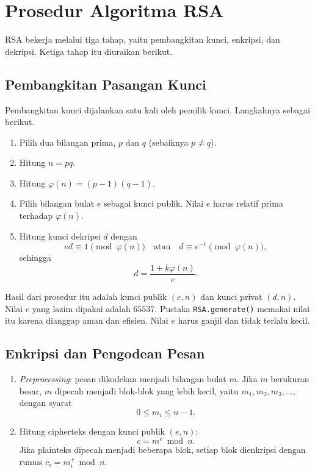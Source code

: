 \section{Prosedur Algoritma RSA}
\label{sec:prosedur-rsa}

RSA bekerja melalui tiga tahap, yaitu pembangkitan kunci, enkripsi, dan
dekripsi. Ketiga tahap itu diuraikan berikut.

\subsection{Pembangkitan Pasangan Kunci}

Pembangkitan kunci dijalankan satu kali oleh pemilik kunci. Langkahnya sebagai
berikut.
\begin{enumerate}
    \item Pilih dua bilangan prima, $p$ dan $q$ (sebaiknya $p \neq q$).
    \item Hitung $n = pq$.
    \item Hitung $\varphi(n) = (p-1)(q-1)$.
    \item Pilih bilangan bulat $e$ sebagai kunci publik. Nilai $e$ harus relatif
          prima terhadap $\varphi(n)$.
    \item Hitung kunci dekripsi $d$ dengan
          \[
          ed \equiv 1 \pmod{\varphi(n)}
          \quad \text{atau} \quad
          d \equiv e^{-1} \pmod{\varphi(n)},
          \]
          sehingga
          \[
          d = \frac{1+k\varphi(n)}{e}.
          \]
\end{enumerate}

Hasil dari prosedur itu adalah kunci publik $(e, n)$ dan kunci privat
$(d, n)$. Nilai $e$ yang lazim dipakai adalah $65537$. Pustaka
\texttt{RSA.generate()} memakai nilai itu karena dianggap aman dan efisien.
Nilai $e$ harus ganjil dan tidak terlalu kecil.

\subsection{Enkripsi dan Pengodean Pesan}

\begin{enumerate}
    \item \textit{Preprocessing}: pesan dikodekan menjadi bilangan bulat $m$.
          Jika $m$ berukuran besar, $m$ dipecah menjadi blok-blok yang lebih
          kecil, yaitu $m_1, m_2, m_3, \dots$, dengan syarat
          \begin{equation}
          0 \le m_i \le n - 1.
          \label{eq:syarat-blok}
          \end{equation}
    \item Hitung cipherteks dengan kunci publik $(e, n)$:
          \begin{equation}
          c = m^e \bmod n.
          \label{eq:enkripsi-blok}
          \end{equation}
          Jika plainteks dipecah menjadi beberapa blok, setiap blok dienkripsi
          dengan rumus $c_i = m_i^{\,e} \bmod n$.
\end{enumerate}

